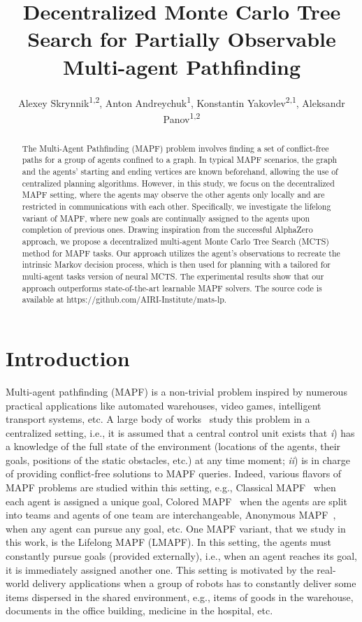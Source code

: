 \documentclass[letterpaper]{article} %
\title{Decentralized Monte Carlo Tree Search for Partially Observable Multi-agent Pathfinding}
\author {
    Alexey Skrynnik\textsuperscript{\rm 1,2},
    Anton Andreychuk\textsuperscript{\rm 1},
    Konstantin Yakovlev\textsuperscript{\rm 2,1},
    Aleksandr Panov\textsuperscript{\rm 1,2}
}
\begin{document}
\maketitle


\begin{abstract}
  The Multi-Agent Pathfinding (MAPF) problem involves finding a set of conflict-free paths for a group of agents confined to a graph. In typical MAPF scenarios, the graph and the agents' starting and ending vertices are known beforehand, allowing the use of centralized planning algorithms. However, in this study, we focus on the decentralized MAPF setting, where the agents may observe the other agents only locally and are restricted in communications with each other. Specifically, we investigate the lifelong variant of MAPF, where new goals are continually assigned to the agents upon completion of previous ones. Drawing inspiration from the successful AlphaZero approach, we propose a decentralized multi-agent Monte Carlo Tree Search (MCTS) method for MAPF tasks. Our approach utilizes the agent's observations to recreate the intrinsic Markov decision process, which is then used for planning with a tailored for multi-agent tasks version of neural MCTS. The experimental results show that our approach outperforms state-of-the-art learnable MAPF solvers. The source code is available at https://github.com/AIRI-Institute/mats-lp.
\end{abstract}


\section{Introduction}
\label{sec:intro}

Multi-agent pathfinding (MAPF) is a non-trivial problem inspired by numerous practical applications like automated warehouses, video games, intelligent transport systems, etc. A large body of works~\cite{ma2019searching,sharon2015conflict,Wagner2011} study this problem in a centralized setting, i.e., it is assumed that a central control unit exists that \emph{i}) has a knowledge of the full state of the environment (locations of the agents, their goals, positions of the static obstacles, etc.) at any time moment; \emph{ii}) is in charge of providing conflict-free solutions to MAPF queries. Indeed, various flavors of MAPF problems are studied within this setting, e.g., Classical MAPF~\cite{stern2019multi} when each agent is assigned a unique goal, Colored MAPF~\cite{ma2016optimal} when the agents are split into teams and agents of one team are interchangeable, Anonymous MAPF~\cite{honig2018conflict}, when any agent can pursue any goal, etc. One MAPF variant, that we study in this work, is the Lifelong MAPF (LMAPF). In this setting, the agents must constantly pursue goals (provided externally), i.e., when an agent reaches its goal, it is immediately assigned another one. This setting is motivated by the real-world delivery applications when a group of robots has to constantly deliver some items dispersed in the shared environment, e.g., items of goods in the warehouse, documents in the office building, medicine in the hospital, etc.
\end{document}
